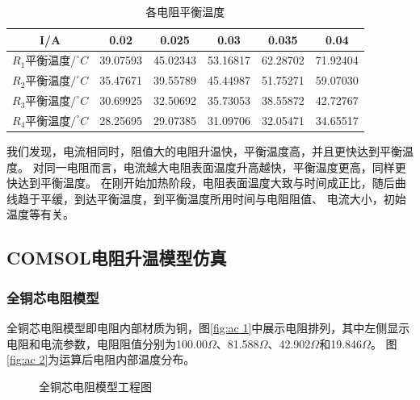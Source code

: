 \documentclass[10pt,a4paper,twoside,UTF8]{ctexart}
\begin{document}
\begin{table}[H]
	\centering
	  \begin{tabular}{cccccc}
	  \toprule
	  I/A& 0.02 & 0.025 & 0.03 & 0.035 &0.04 \\
	  \midrule
	  $R_1$平衡温度$/^{\circ}C$&39.07593&45.02343&53.16817&62.28702&71.92404\\
	  $R_2$平衡温度$/^{\circ}C$&35.47671&39.55789&45.44987&51.75271&59.07030\\
	  $R_3$平衡温度$/^{\circ}C$&30.69925&32.50692&35.73053&38.55872&42.72767\\
	  $R_4$平衡温度$/^{\circ}C$&28.25695&29.07385&31.09706&32.05471&34.65517\\
	  \bottomrule
	\end{tabular}
	\caption{各电阻平衡温度}	  
	\label{tab: 3}
  \end{table}
  
我们发现，电流相同时，阻值大的电阻升温快，平衡温度高，并且更快达到平衡温度。
对同一电阻而言，电流越大电阻表面温度升高越快，平衡温度更高，同样更快达到平衡温度。
在刚开始加热阶段，电阻表面温度大致与时间成正比，随后曲线趋于平缓，到达平衡温度，到平衡温度所用时间与电阻阻值、
电流大小，初始温度等有关。

\subsection{COMSOL电阻升温模型仿真}

\subsubsection{全铜芯电阻模型}
全铜芯电阻模型即电阻内部材质为铜，图\ref{fig:ac 1}中展示电阻排列，其中左侧显示电阻和电流参数，电阻阻值分别为100.00$\Omega$、81.588$\Omega$、42.902$\Omega$和19.846$\Omega$。
图\ref{fig:ac 2}为运算后电阻内部温度分布。
\begin{figure}[H]
	\centering
	\caption{全铜芯电阻模型工程图}
\end{figure}
\end{document}

